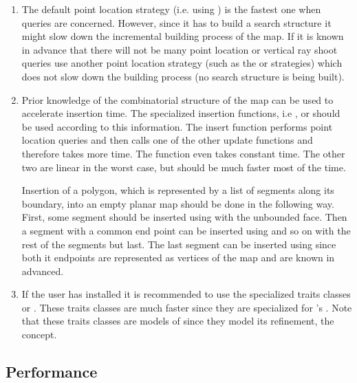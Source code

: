 \begin{enumerate}
   \item The default point location strategy (i.e. using
   ) is the fastest one when queries
   are concerned. However, since it has to build a search structure it
   might slow down the incremental building process of the map. If it
   is known in advance that there will not be many point location or
   vertical ray shoot queries use another point location strategy
   (such as the  or  strategies) which does not
   slow down the building process (no search structure is being
   built).

   \item Prior knowledge of the combinatorial structure of the map can
   be used to accelerate insertion time. The specialized insertion
   functions, i.e ,
    or  should be used
   according to this information. The insert function performs point
   location queries and then calls one of the other update functions
   and therefore takes more time.  The function
    even takes constant time. The other
   two are linear in the worst case, but should be much faster most of
   the time.

   Insertion of a polygon, which is represented by a list of segments
   along its boundary, into an empty planar map should be done in the
   following way. First, some segment should be inserted using
    with the unbounded face. Then a
   segment with a common end point can be inserted using
    and so on with the rest of the segments
   but last. The last segment can be inserted using
    since both it endpoints are represented as
   vertices of the map and are known in advanced.
 
   \item If the user has \leda\/ installed it is recommended to use
   the specialized traits classes 
   or . These traits classes are much
   faster since they are specialized for \leda\/'s . Note that these traits classes are models of
    since they model its refinement, the
    concept.

\end{enumerate}

\subsection*{Performance}

